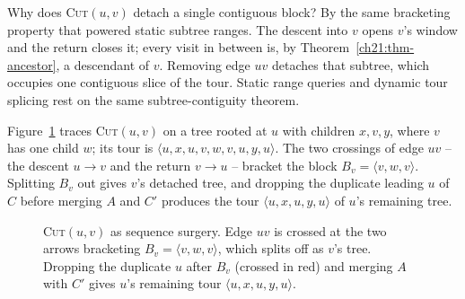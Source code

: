 \begin{whybox}
Why does \textsc{Cut}$(u,v)$ detach a single contiguous block? By the same
bracketing property that powered static subtree ranges. The descent into $v$ opens
$v$'s window and the return closes it; every visit in between is, by
Theorem~\ref{ch21:thm-ancestor}, a descendant of $v$. Removing edge $uv$ detaches
that subtree, which occupies one contiguous slice of the tour. Static range queries
and dynamic tour splicing rest on the same subtree-contiguity theorem.
\end{whybox}

Figure~\ref{ch21:fig-cut} traces \textsc{Cut}$(u,v)$ on a tree rooted at $u$
with children $x,v,y$, where $v$ has one child $w$; its tour is
$\langle u,x,u,v,w,v,u,y,u\rangle$. The two crossings of edge $uv$ -- the descent
$u\!\to\!v$ and the return $v\!\to\!u$ -- bracket the block $B_v = \langle v,w,v\rangle$.
Splitting $B_v$ out gives $v$'s detached tree, and dropping the duplicate leading $u$ of $C$ before merging $A$ and $C'$ produces the tour
$\langle u,x,u,y,u\rangle$ of $u$'s remaining tree.

\begin{figure}[htbp]
\centering
{}
\caption{\textsc{Cut}$(u,v)$ as sequence surgery. Edge $uv$ is crossed at the two
arrows bracketing $B_v = \langle v,w,v\rangle$, which splits off as
$v$'s tree. Dropping the duplicate $u$ after $B_v$ (crossed in red) and merging $A$ with $C'$ gives $u$'s remaining tour $\langle u,x,u,y,u\rangle$.}
\label{ch21:fig-cut}
\end{figure}

